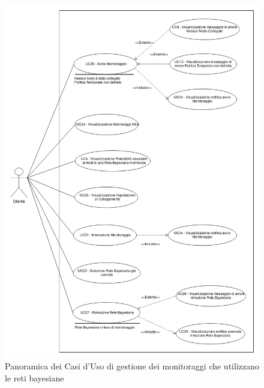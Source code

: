 \begin{figure}[H]
	\begin{center}
		\includegraphics[scale=0.4]{./images/VistaUC2.png}
		 \caption{Panoramica dei Casi d'Uso di gestione dei monitoraggi che utilizzano le reti bayesiane}
		 \label{Panoramica UC Monitoraggio}
	\end{center}
\end{figure}

\pagebreak

\pagebreak
